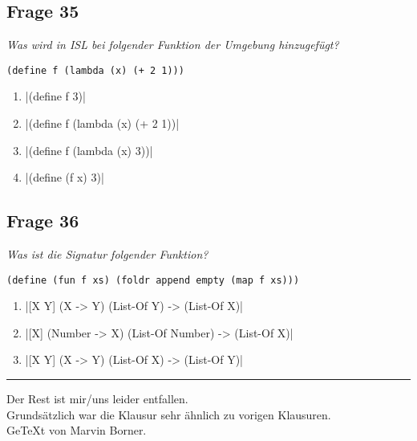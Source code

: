 \documentclass[a4paper, 11pt]{article}
\begin{document}
\subsection*{Frage 35}
\textit{Was wird in ISL bei folgender Funktion der Umgebung hinzugefügt?}
\begin{verbatim}
(define f (lambda (x) (+ 2 1)))
\end{verbatim}
\begin{enumerate}[label=$\square$]
	\item {}|(define f 3)|
	\item {}|(define f (lambda (x) (+ 2 1))|
	\item {}|(define f (lambda (x) 3))|
	\item {}|(define (f x) 3)|
\end{enumerate}

\subsection*{Frage 36}
\textit{Was ist die Signatur folgender Funktion?}
\begin{verbatim}
(define (fun f xs) (foldr append empty (map f xs)))
\end{verbatim}
\begin{enumerate}[label=$\square$]
	\item {}|[X Y] (X -> Y) (List-Of Y) -> (List-Of X)|
	\item {}|[X] (Number -> X) (List-Of Number) -> (List-Of X)|
	\item {}|[X Y] (X -> Y) (List-Of X) -> (List-Of Y)|
\end{enumerate}

\noindent\rule[0.5ex]{\linewidth}{1pt}

\begin{center}
	Der Rest ist mir/uns leider entfallen.\\
	Grundsätzlich war die Klausur sehr ähnlich zu vorigen Klausuren.\\
	GeTeXt von Marvin Borner.
\end{center}
\end{document}
